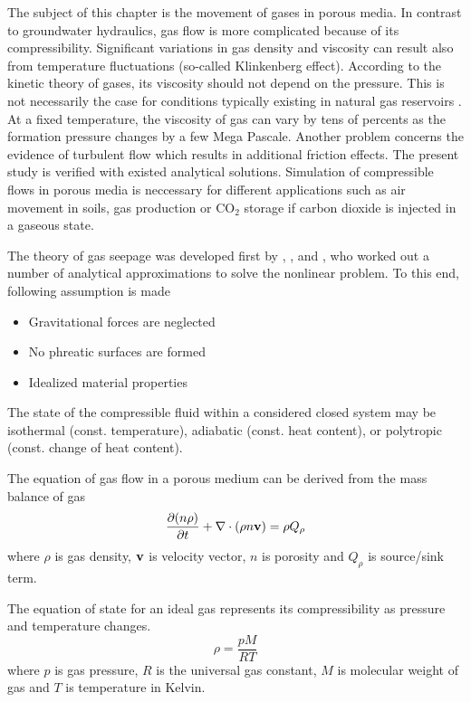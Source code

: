 
The subject of this chapter is the movement of gases in porous media. In contrast to groundwater hydraulics, gas flow is more complicated because of its compressibility. Significant variations in gas density and viscosity can result also from temperature fluctuations (so-called Klinkenberg effect). According to the kinetic theory of gases, its viscosity should not depend on the pressure. This is not necessarily the case for conditions typically existing in natural gas reservoirs \cite{VoiLau:1985}. At a fixed temperature, the viscosity of gas can vary by tens of percents as the formation pressure changes by a few Mega Pascale. Another problem concerns the evidence of turbulent flow which results in additional friction effects. The present study is verified with existed analytical solutions. Simulation of compressible flows in porous media is neccessary for different applications such as air movement in soils, gas production or $\mathrm {CO_2}$ storage if carbon dioxide is injected in a gaseous state.


The theory of gas seepage was developed first by \cite{Muskat:1937}, \cite{Leibenzon:1947}, and \cite{AraNum:1965}, who worked out a number of analytical approximations to solve the nonlinear problem. To this end, following assumption is made
\begin{itemize}
\item Gravitational forces are neglected
\item No phreatic surfaces are formed
\item Idealized material properties
\end{itemize}
The state of the compressible fluid within a considered closed system may be isothermal (const. temperature), adiabatic (const. heat content), or polytropic (const. change of heat content).


The equation of gas flow in a porous medium can be derived from the mass balance of gas
\begin{equation}
\frac{\p (n \rho)}{\p t}+\nabla \cdot (\rho n \v)=\rho Q_\rho
\label{eqn:fluid_mass_1}
\end{equation}
where $\rho$ is gas density, $\mathbf v$ is velocity vector, $n$ is porosity and $Q_{\rho}$ is source/sink term.


The equation of state for an ideal gas represents its compressibility as pressure and temperature changes.
\begin{equation}
\rho=\frac{p M}{R T}
\label{eqn:ideal_gas_law}
\end{equation}
where $p$ is gas pressure, $R$ is the universal gas constant, $M$ is molecular weight of gas and $T$ is temperature in Kelvin.



